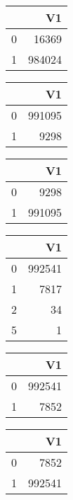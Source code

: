\bigskip\bigskip
\centering
\begin{tabular}{rr}
  \hline
 & V1 \\ 
  \hline
0 & 16369 \\ 
  1 & 984024 \\ 
   \hline
\end{tabular}

\bigskip\bigskip
\centering
\begin{tabular}{rr}
  \hline
 & V1 \\ 
  \hline
0 & 991095 \\ 
  1 & 9298 \\ 
   \hline
\end{tabular}

\bigskip\bigskip
\centering
\begin{tabular}{rr}
  \hline
 & V1 \\ 
  \hline
0 & 9298 \\ 
  1 & 991095 \\ 
   \hline
\end{tabular}

\bigskip\bigskip
\centering
\begin{tabular}{rr}
  \hline
 & V1 \\ 
  \hline
0 & 992541 \\ 
  1 & 7817 \\ 
  2 &  34 \\ 
  5 &   1 \\ 
   \hline
\end{tabular}

\bigskip\bigskip
\centering
\begin{tabular}{rr}
  \hline
 & V1 \\ 
  \hline
0 & 992541 \\ 
  1 & 7852 \\ 
   \hline
\end{tabular}

\bigskip\bigskip
\centering
\begin{tabular}{rr}
  \hline
 & V1 \\ 
  \hline
0 & 7852 \\ 
  1 & 992541 \\ 
   \hline
\end{tabular}

